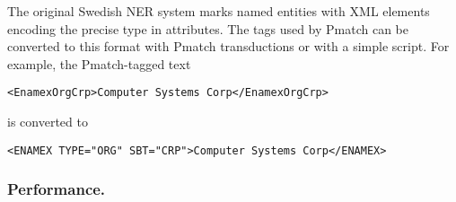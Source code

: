 \documentclass{llncs}
\begin{document}

The original Swedish NER system marks named entities with XML elements
encoding the precise type in attributes. The tags used by Pmatch can
be converted to this format with Pmatch transductions or with a simple
script. For example, the Pmatch-tagged text
%
\begin{verbatim}
<EnamexOrgCrp>Computer Systems Corp</EnamexOrgCrp>
\end{verbatim}
is converted to
\begin{verbatim}
<ENAMEX TYPE="ORG" SBT="CRP">Computer Systems Corp</ENAMEX>
\end{verbatim}





\subsubsection{Performance.}
\end{document}
